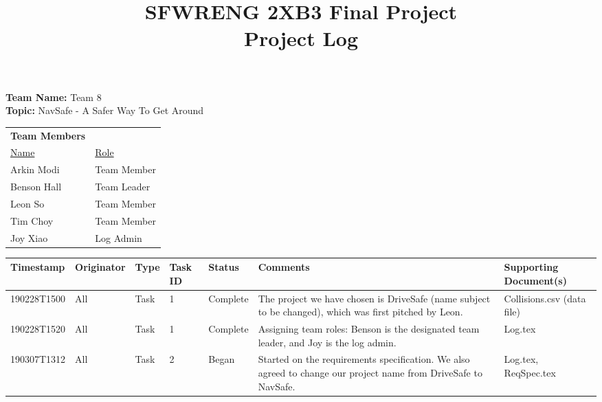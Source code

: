 \documentclass[12pt]{article}
\title{SFWRENG 2XB3 Final Project \\
        \large Project Log
        \vspace{-4ex}}
\date{}
\begin{document}
    \maketitle

    \textbf{ Team Name:} Team 8 \\
    \indent \textbf{ Topic:} NavSafe - A Safer Way To Get Around \\

    \begin{tabular}{ll}
        \textbf{Team Members} & ~ \\
        \underline{Name} & \underline{Role} \\
        Arkin Modi  & Team Member\\
        Benson Hall & Team Leader \\
        Leon So     & Team Member\\
        Tim Choy    & Team Member \\
        Joy Xiao    & Log Admin \\
    \end{tabular}
    \newline
    \vspace{1cm}
    \newline
    \begin{tabular}{| l | l | l | P{1cm} | l | P{3cm} | P{3cm} |}
        \hline
        \textbf{Timestamp} & \textbf{Originator} & \textbf{Type} 
        & \textbf{Task ID} & \textbf{Status} & \textbf{Comments} 
        & \textbf{Supporting Document(s)}\\
        \hline
        190228T1500 & All & Task & 1 & Complete & The project we have chosen is 
        DriveSafe (name subject to be changed), which was first pitched by 
        Leon. & Collisions.csv (data file)\\
        \hline
        190228T1520 & All & Task & 1 & Complete & Assigning team roles: Benson is the 
        designated team leader, and Joy is the log admin. & Log.tex\\
        \hline
        190307T1312 & All & Task & 2 & Began & Started on the requirements specification. We also agreed to change our project name from DriveSafe to NavSafe. & Log.tex, ReqSpec.tex\\
        \hline
    \end{tabular}
    
\end{document}
